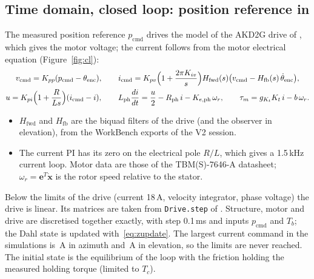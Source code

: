 \documentclass[10pt,a4paper]{article}
\numberwithin{equation}{section}
\begin{document}
\subsection{Time domain, closed loop: position reference in}\label{sec:cl}
The measured position reference $p_\mathrm{cmd}$ drives the model of the AKD2G drive of , which gives the motor voltage; the current follows from the motor electrical equation (Figure~\ref{fig:cl}):
\begin{gather}
v_\mathrm{cmd}=K_{pp}(p_\mathrm{cmd}-\theta_\mathrm{enc}),\qquad
i_\mathrm{cmd}=K_{pv}\Bigl(1+\frac{2\pi K_{iv}}{s}\Bigr)H_\mathrm{fwd}(s)\bigl(v_\mathrm{cmd}-H_\mathrm{fb}(s)\,\dot\theta_\mathrm{enc}\bigr),\\
u=K_{pi}\Bigl(1+\frac{R}{Ls}\Bigr)(i_\mathrm{cmd}-i),\qquad L_\mathrm{ph}\frac{di}{dt}=\frac u2-R_\mathrm{ph}\,i-K_{e,\mathrm{ph}}\,\omega_r,\qquad \tau_m=g_{K_t}K_t\,i-b\,\omega_r .\label{eq:drive}
\end{gather}
\begin{itemize}
\item $H_\mathrm{fwd}$ and $H_\mathrm{fb}$ are the biquad filters of the drive (and the observer in elevation), from the WorkBench exports of the V2 session.
\item The current PI has its zero on the electrical pole $R/L$, which gives a 1.5\,kHz current loop. Motor data are those of the TBM(S)-7646-A datasheet; $\omega_r=\mathbf e^T\dot{\mathbf x}$ is the rotor speed relative to the stator.
\end{itemize}
Below the limits of the drive (current 18\,A, velocity integrator, phase voltage) the drive is linear. Its matrices are taken from \texttt{Drive.step} of . Structure, motor and drive are discretised together exactly, with step 0.1\,ms and inputs $p_\mathrm{cmd}$ and $T_b$; the Dahl state is updated with~\eqref{eq:zupdate}. The largest current command in the simulations is \icmdMaxA\,A in azimuth and \icmdMaxP\,A in elevation, so the limits are never reached. The initial state is the equilibrium of the loop with the friction holding the measured holding torque (limited to $T_c$).
\end{document}
